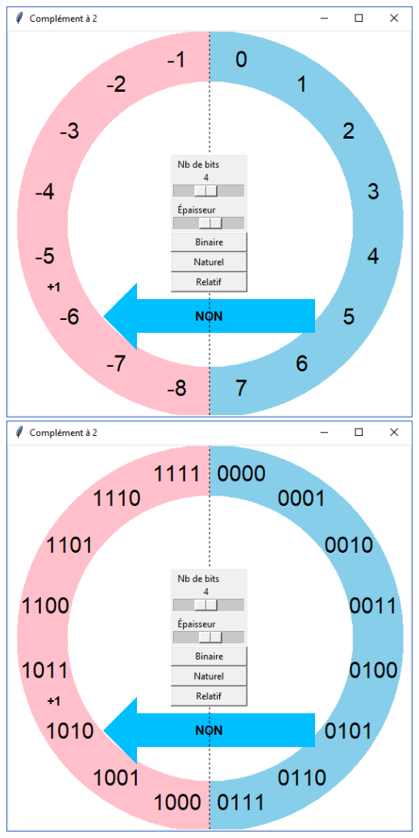 \begin{center}
\includegraphics[scale=0.33]{images/complementa2rel.png}\quad
\includegraphics[scale=0.33]{images/complementa2bin.png}
\end{center}

